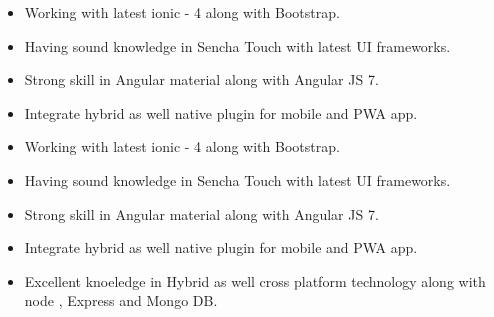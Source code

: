 \documentclass[10pt,a4paper]{altacv}
\begin{document}

\begin{fullwidth}
\makecvheader
\end{fullwidth}


\begin{itemize}
\item Working with latest ionic - 4 along with Bootstrap.
\item Having sound knowledge in Sencha Touch with latest UI frameworks.
\item Strong skill in Angular material along with Angular JS 7.
\item Integrate hybrid as well native plugin for mobile and PWA app.
\end{itemize}
\begin{itemize}
\item Working with latest ionic - 4 along with Bootstrap.
\item Having sound knowledge in Sencha Touch with latest UI frameworks.
\item Strong skill in Angular material along with Angular JS 7.
\item Integrate hybrid as well native plugin for mobile and PWA app.
\item Excellent knoeledge in Hybrid as well cross platform technology along with node , Express and Mongo DB.
\end{itemize}
\end{document}
